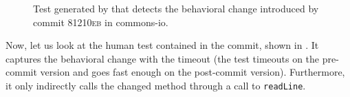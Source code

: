 \begin{figure}[h]
\centering
{}
\caption{Test generated by \DCII that detects the behavioral change introduced by commit \textsc{81210eb} in commons-io.}
\label{fig:ampl_commons-io}
\end{figure}

Now, let us look at the human test contained in the commit, shown in .
It captures the behavioral change with the timeout (the test timeouts on the pre-commit version and goes fast enough on the post-commit version). 
Furthermore, it only indirectly calls the changed method through a call to \texttt{readLine}.

